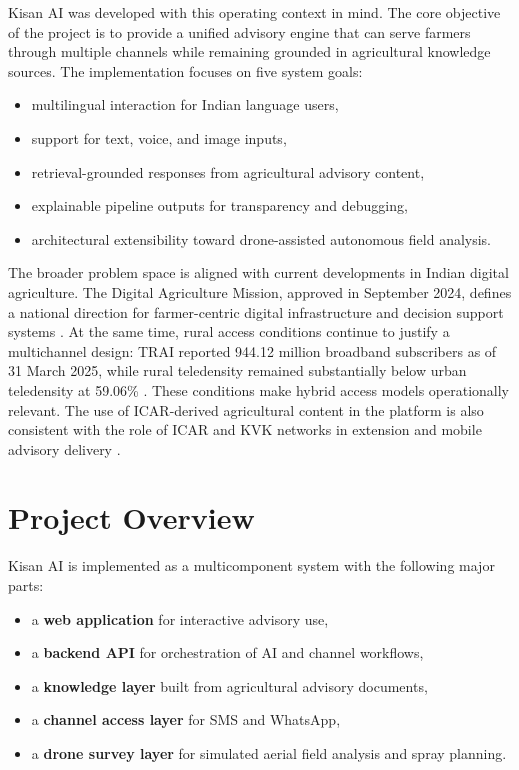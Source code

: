 \documentclass[11pt,a4paper]{article}
\begin{document}
Kisan AI was developed with this operating context in mind. The core objective of the project is to provide a unified advisory engine that can serve farmers through multiple channels while remaining grounded in agricultural knowledge sources. The implementation focuses on five system goals:

\begin{itemize}
  \item multilingual interaction for Indian language users,
  \item support for text, voice, and image inputs,
  \item retrieval-grounded responses from agricultural advisory content,
  \item explainable pipeline outputs for transparency and debugging,
  \item architectural extensibility toward drone-assisted autonomous field analysis.
\end{itemize}

The broader problem space is aligned with current developments in Indian digital agriculture. The Digital Agriculture Mission, approved in September 2024, defines a national direction for farmer-centric digital infrastructure and decision support systems \cite{pib-dam-2024,pib-dam-2025}. At the same time, rural access conditions continue to justify a multichannel design: TRAI reported 944.12 million broadband subscribers as of 31 March 2025, while rural teledensity remained substantially below urban teledensity at 59.06\% \cite{trai-2025}. These conditions make hybrid access models operationally relevant. The use of ICAR-derived agricultural content in the platform is also consistent with the role of ICAR and KVK networks in extension and mobile advisory delivery \cite{icar-extension}.

\section{Project Overview}

Kisan AI is implemented as a multicomponent system with the following major parts:

\begin{itemize}
  \item a \textbf{web application} for interactive advisory use,
  \item a \textbf{backend API} for orchestration of AI and channel workflows,
  \item a \textbf{knowledge layer} built from agricultural advisory documents,
  \item a \textbf{channel access layer} for SMS and WhatsApp,
  \item a \textbf{drone survey layer} for simulated aerial field analysis and spray planning.
\end{itemize}
\end{document}

